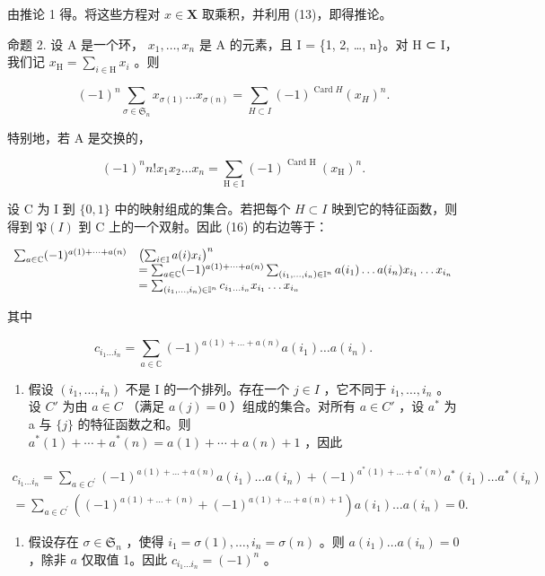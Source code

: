 由推论 1 得。将这些方程对 \(x \in \mathbf{X}\) 取乘积，并利用 (13)，即得推论。

命题 2. 设 A 是一个环， \(x_{1}, \ldots, x_{n}\) 是 A 的元素，且 I = \{1, 2, \ldots, n\}。对 H ⊂ I，我们记 \(x_{\mathrm{H}} = \sum_{i \in \mathrm{H}} x_{i}\) 。则

\[
(- 1) ^ {n} \sum_ {\sigma \in \mathfrak {S} _ {n}} x _ {\sigma (1)} \dots x _ {\sigma (n)} = \sum_ {H \subset I} (- 1) ^ {\operatorname{Card} H} (x _ {H}) ^ {n}.\tag{16}
\]

特别地，若 A 是交换的，

\[
(- 1) ^ {n} n! x _ {1} x _ {2} \dots x _ {n} = \sum_ {\mathrm{H} \in \mathrm{I}} (- 1) ^ {\text { Card   H }} (x _ {\mathrm{H}}) ^ {n}.
\]

设 C 为 I 到 \(\{0,1\}\) 中的映射组成的集合。若把每个 \(H \subset I\) 映到它的特征函数，则得到 \(\mathfrak{P}(I)\) 到 C 上的一个双射。因此 (16) 的右边等于：

\[
\begin{array}{r l} \sum_ {a \in \mathbb {C}} (- 1) ^ {a (1) + \dots + a (n)} & \left(\sum_ {i \in \mathbb {I}} a (i) x _ {i}\right) ^ {n} \\ & = \sum_ {a \in \mathbb {C}} (- 1) ^ {a (1) + \dots + a (n)} \sum_ {(i _ {1}, \ldots , i _ {n}) \in \mathbb {I} ^ {n}} a (i _ {1}) \ldots a (i _ {n}) x _ {i _ {1}} \ldots x _ {i _ {n}} \\ & = \sum_ {(i _ {1}, \ldots , i _ {n}) \in \mathbb {I} ^ {n}} c _ {i _ {1} \ldots i _ {n}} x _ {i _ {1}} \ldots x _ {i _ {n}} \end{array}
\]

其中

\[
c _ {i _ {1} \dots i _ {n}} = \sum_ {a \in \mathbb {C}} (- 1) ^ {a (1) + \dots + a (n)} a (i _ {1}) \dots a (i _ {n}).
\]

\begin{enumerate}
\def\labelenumi{(\arabic{enumi})}
\tightlist
\item
  假设 \((i_{1},\ldots,i_{n})\) 不是 I 的一个排列。存在一个 \(j\in I\) ，它不同于 \(i_{1},\ldots,i_{n}\) 。设 \(C'\) 为由 \(a\in C\) （满足 \(a(j)=0\) ）组成的集合。对所有 \(a\in C'\) ，设 \(a^{*}\) 为 a 与 \(\{j\}\) 的特征函数之和。则 \(a^{*}(1)+\cdots+a^{*}(n)=a(1)+\cdots+a(n)+1\) ，因此
\end{enumerate}

\[
\begin{array}{l} c _ {i _ {1} \dots i _ {n}} = \sum_ {a \in C ^ {\prime}} (- 1) ^ {a (1) + \dots + a (n)} a (i _ {1}) \dots a (i _ {n}) + (- 1) ^ {a ^ {*} (1) + \dots + a ^ {*} (n)} a ^ {*} (i _ {1}) \dots a ^ {*} (i _ {n}) \\ = \sum_ {a \in C ^ {\prime}} ((- 1) ^ {a (1) + \dots + (n)} + (- 1) ^ {a (1) + \dots + a (n) + 1}) a (i _ {1}) \dots a (i _ {n}) = 0. \end{array}
\]

\begin{enumerate}
\def\labelenumi{(\arabic{enumi})}
\setcounter{enumi}{1}
\tightlist
\item
  假设存在 \(\sigma \in \mathfrak{S}_n\) ，使得 \(i_1 = \sigma(1), \ldots, i_n = \sigma(n)\) 。则 \(a(i_1) \ldots a(i_n) = 0\) ，除非 \(a\) 仅取值 1。因此 \(c_{i_1 \ldots i_n} = (-1)^n\) 。
\end{enumerate}

